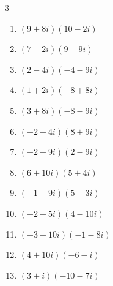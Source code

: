 \begin{multicols}{3}
\begin{enumerate}
        \phantom{$\displaystyle =-21+49i$}

\columnbreak %

  \item $\displaystyle (9+8i)(10-2i)$

        \phantom{$\displaystyle =106+62i$}

  \item $\displaystyle (7-2i)(9-9i)$

        \phantom{$\displaystyle =45-81i$}

  \item $\displaystyle (2-4i)(-4-9i)$

        \phantom{$\displaystyle =-44-2i$}

  \item $\displaystyle (1+2i)(-8+8i)$

        \phantom{$\displaystyle =-24-8i$}

  \item $\displaystyle (3+8i)(-8-9i)$

        \phantom{$\displaystyle =48-91i$}

  \item $\displaystyle (-2+4i)(8+9i)$

        \phantom{$\displaystyle =-52+14i$}

  \item $\displaystyle (-2-9i)(2-9i)$

        \phantom{$\displaystyle =-85$}

  \item $\displaystyle (6+10i)(5+4i)$

        \phantom{$\displaystyle =-10+74i$}

  \item $\displaystyle (-1-9i)(5-3i)$

        \phantom{$\displaystyle =-32-42i$}

  \item $\displaystyle (-2+5i)(4-10i)$

        \phantom{$\displaystyle =42+40i$}

  \item $\displaystyle (-3-10i)(-1-8i)$

        \phantom{$\displaystyle =-77+34i$}

  \item $\displaystyle (4+10i)(-6-i)$

        \phantom{$\displaystyle =-14-64i$}

  \item $\displaystyle (3+i)(-10-7i)$


\end{enumerate}
\end{multicols}
